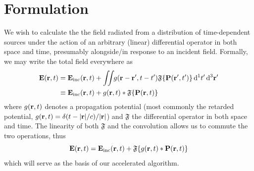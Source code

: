 \section{Formulation}

We wish to calculate the the field radiated from a distribution of time-dependent sources under the action of an arbitrary (linear) differential operator in both space and time, presumably alongside/in response to an incident field.
Formally, we may write the total field everywhere as
\begin{equation}
  \begin{aligned}
      \vb{E}(\vb{r}, t) &= \vb{E}_\text{inc}(\vb{r}, t) + \iint_{} \kern0.1em g(\vb{r} - \vb{r}', t - t') \mathfrak{F}\qty{\vb{P}(\vb{r}', t')} \dd[1]{t'} \dd[3]{\vb{r}'} \\
                        &\equiv \vb{E}_\text{inc}(\vb{r}, t) + g(\vb{r}, t) \ast \mathfrak{F}\qty{\vb{P}(\vb{r}, t)}
    \end{aligned}
  \label{eq:commuted propagator}
\end{equation}
where $g(\vb{r}, t)$ denotes a propagation potential (most commonly the retarded potential, $g(\vb{r}, t) = \delta(t - \abs{\vb{r}}/c)/\abs{\vb{r}}$) and $\mathfrak{F}$ the differential operator in both space and time.
The linearity of both $\mathfrak{F}$ and the convolution allows us to commute the two operations, thus
\begin{equation}
  \vb{E}(\vb{r}, t) = \vb{E}_\text{inc}(\vb{r}, t) + \mathfrak{F}\qty{g(\vb{r}, t) \ast \vb{P}(\vb{r}, t)}
  \label{eq:propagator}
\end{equation}
which will serve as the basis of our accelerated algorithm.

